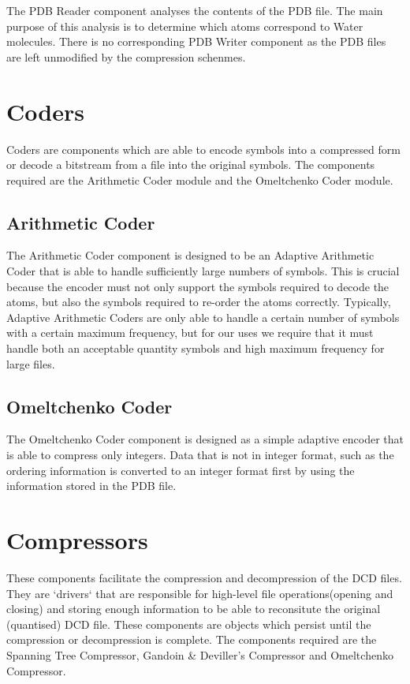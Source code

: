 \documentclass[a4paper,11pt]{report}
\begin{document}
The PDB Reader component analyses the contents of the PDB file. The main purpose of this analysis is to determine which atoms correspond to Water molecules. There is no corresponding PDB Writer component as the PDB files are left unmodified by the compression schenmes. 

\section{Coders}

Coders are components which are able to encode symbols into a compressed form or decode a bitstream from a file into the original symbols. The components required are the Arithmetic Coder module and the Omeltchenko Coder module.

\subsection{Arithmetic Coder}

The Arithmetic Coder component is designed to be an Adaptive Arithmetic Coder that is able to handle sufficiently large numbers of symbols. This is crucial because the encoder must not only support the symbols required to decode the atoms, but also the symbols required to re-order the atoms correctly. Typically, Adaptive Arithmetic Coders are only able to handle a certain number of symbols with a certain maximum frequency, but for our uses we require that it must handle both an acceptable quantity symbols and high maximum frequency for large files.

\subsection{Omeltchenko Coder}

The Omeltchenko Coder component is designed as a simple adaptive encoder that is able to compress only integers. Data that is not in integer format, such as the ordering information is converted to an integer format first by using the information stored in the PDB file.

\section{Compressors}

These components facilitate the compression and decompression of the DCD files. They are `drivers` that are responsible for high-level file operations(opening and closing) and storing enough information to be able to reconsitute the original (quantised) DCD file. These components are objects which persist until the compression or decompression is complete. The components required are the Spanning Tree Compressor, Gandoin \& Deviller's Compressor and Omeltchenko Compressor.
\end{document}
